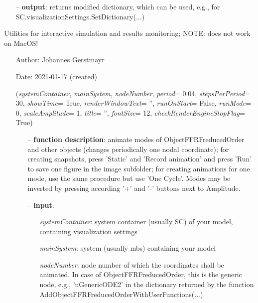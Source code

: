 \begin{itemize}[leftmargin=1.4cm]
\begin{itemize}[leftmargin=1.4cm]
\begin{itemize}[leftmargin=0.5cm]
\begin{itemize}[leftmargin=1.4cm]
\begin{itemize}[leftmargin=1.4cm]
\begin{itemize}[leftmargin=0.5cm]
\begin{itemize}[leftmargin=1.4cm]
\begin{itemize}[leftmargin=0.5cm]
\begin{itemize}[leftmargin=1.4cm]
\begin{itemize}[leftmargin=0.7cm]
\begin{itemize}[leftmargin=1.2cm]
  \end{itemize}
  \item[--]  {\bf output}: returns modified dictionary, which can be used, e.g., for SC.visualizationSettings.SetDictionary(...)\vspace{12pt}\end{itemize}
%
\label{sec:module:interactive}
  Utilities for interactive simulation and results monitoring; NOTE: does not work on MacOS!
\begin{itemize}[leftmargin=1.4cm]
\setlength{\itemindent}{-1.4cm}
\item[]Author:    Johannes Gerstmayr
\item[]Date:      2021-01-17 (created)
\ei
\begin{flushleft}
\label{sec:interactive:AnimateModes}
({\it systemContainer}, {\it mainSystem}, {\it nodeNumber}, {\it period}= 0.04, {\it stepsPerPeriod}= 30, {\it showTime}= True, {\it renderWindowText}= '', {\it runOnStart}= False, {\it runMode}= 0, {\it scaleAmplitude}= 1, {\it title}= '', {\it fontSize}= 12, {\it checkRenderEngineStopFlag}= True)
\end{flushleft}
\setlength{\itemindent}{0.7cm}
\begin{itemize}[leftmargin=0.7cm]
  \item[--]  {\bf function description}: animate modes of ObjectFFRFreducedOrder and other objects (changes periodically one nodal coordinate); for creating snapshots, press 'Static' and 'Record animation' and press 'Run' to save one figure in the image subfolder; for creating animations for one mode, use the same procedure but use 'One Cycle'. Modes may be inverted by pressing according '+' and '-' buttons next to Amplitude.  \item[--]  {\bf input}: \vspace{-6pt}
  \begin{itemize}[leftmargin=1.2cm]
\setlength{\itemindent}{-0.7cm}
    \item[] {\it systemContainer}: system container (usually SC) of your model, containing visualization settings
    \item[] {\it     mainSystem}: system (usually mbs) containing your model
    \item[] {\it     nodeNumber}: node number of which the coordinates shall be animated. In case of ObjectFFRFreducedOrder, this is the generic node, e.g., 'nGenericODE2' in the dictionary returned by the function AddObjectFFRFreducedOrderWithUserFunctions(...)

\end{itemize}
\end{itemize}
\end{itemize}
\end{itemize}
\end{itemize}
\end{itemize}
\end{itemize}
\end{itemize}
\end{itemize}
\end{itemize}
\end{itemize}
\end{itemize}
